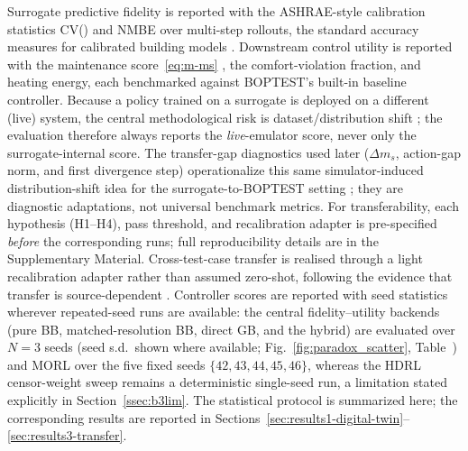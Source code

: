 Surrogate predictive fidelity is reported with the ASHRAE-style calibration
statistics CV(\RMSE) and NMBE over multi-step rollouts, the standard accuracy
measures for calibrated building models \citep{Bacher2011RCIdentification}.
Downstream control utility is reported with the maintenance score~\eqref{eq:m-ms}
\citep{Wang2025SafeDRL}, the comfort-violation fraction, and heating energy,
each benchmarked against BOPTEST's built-in baseline controller. Because a policy
trained on a surrogate is deployed on a different (live) system, the central
methodological risk is dataset/distribution shift \citep{Quinonero2009DatasetShift};
the evaluation therefore always reports the \emph{live}-emulator score, never only the
surrogate-internal score. The transfer-gap diagnostics used later ($\Delta m_s$, action-gap norm, and first divergence step) operationalize this same simulator-induced distribution-shift idea for the surrogate-to-BOPTEST setting \citep{Quinonero2009DatasetShift,RiahiSamani2026OOD}; they are diagnostic adaptations, not universal benchmark metrics. For transferability, each hypothesis (H1--H4), pass threshold, and recalibration adapter is pre-specified \emph{before} the corresponding runs; full reproducibility details are in the Supplementary Material. Cross-test-case transfer is realised through a light recalibration adapter
rather than assumed zero-shot, following the evidence that transfer is
source-dependent \citep{Hou2024MultiSource}. Controller scores are reported with
seed statistics wherever repeated-seed runs are available: the central fidelity--utility
backends (pure BB, matched-resolution BB, direct GB, and the hybrid) are evaluated over $N=3$
seeds (seed s.d.\ shown where available; Fig.~\ref{fig:paradox_scatter}, Table~)
and MORL over the five fixed seeds $\{42,43,44,45,46\}$, whereas the HDRL censor-weight
sweep remains a deterministic single-seed run, a limitation stated explicitly in Section~\ref{ssec:b3lim}. The statistical protocol is summarized here; the corresponding results are reported in
Sections~\ref{sec:results1-digital-twin}--\ref{sec:results3-transfer}.

